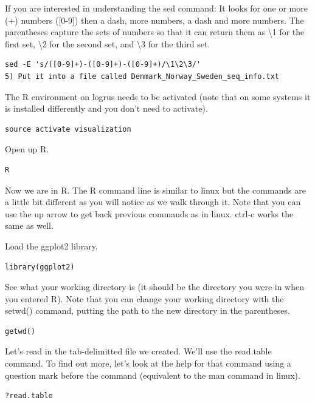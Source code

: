 \documentclass[
]{book}
\begin{document}
If you are interested in understanding the sed command: It looks for one or more (+) numbers ({[}0-9{]}) then a dash, more numbers, a dash and more numbers. The parentheses capture the sets of numbers so that it can return them as \textbackslash1 for the first set, \textbackslash2 for the second set, and \textbackslash3 for the third set.

\begin{verbatim}
sed -E 's/([0-9]+)-([0-9]+)-([0-9]+)/\1\2\3/'
5) Put it into a file called Denmark_Norway_Sweden_seq_info.txt
\end{verbatim}

The R environment on logrus needs to be activated (note that on some systems it is installed differently and you don't need to activate).

\begin{verbatim}
source activate visualization
\end{verbatim}

Open up R.

\begin{verbatim}
R
\end{verbatim}

Now we are in R. The R command line is similar to linux but the commands are a little bit different as you will notice as we walk through it. Note that you can use the up arrow to get back previous commands as in linux. ctrl-c works the same as well.

Load the ggplot2 library.

\begin{verbatim}
library(ggplot2)
\end{verbatim}

See what your working directory is (it should be the directory you were in when you entered R). Note that you can change your working directory with the setwd() command, putting the path to the new directory in the parentheses.

\begin{verbatim}
getwd()
\end{verbatim}

Let's read in the tab-delimitted file we created. We'll use the read.table command. To find out more, let's look at the help for that command using a question mark before the command (equivalent to the man command in linux).

\begin{verbatim}
?read.table
\end{verbatim}
\end{document}

